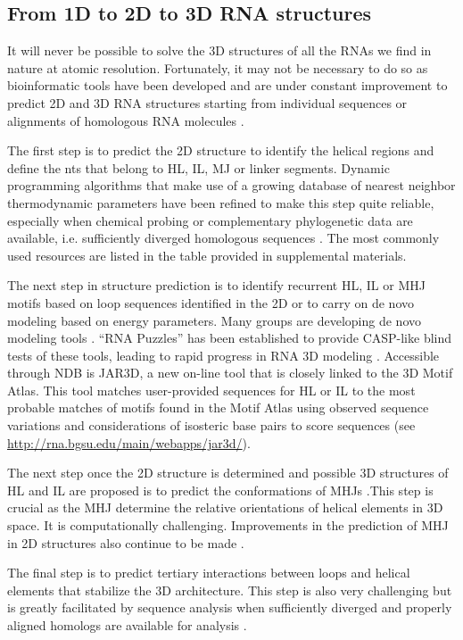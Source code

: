 \subsection{From 1D to 2D to 3D RNA structures}

It will never be possible to solve the 3D structures of all the RNAs we find in
nature at atomic resolution. Fortunately, it may not be necessary to do so as
bioinformatic tools have been developed and are under constant improvement to
predict 2D and 3D RNA structures starting from individual sequences or
alignments of homologous RNA molecules \cite{Leontis2012e}. 

The first step is to predict the 2D structure to identify the helical regions
and define the nts that belong to HL, IL, MJ or linker segments. Dynamic
programming algorithms that make use of a growing database of nearest neighbor
thermodynamic parameters have been refined to make this step quite reliable,
especially when chemical probing or complementary phylogenetic data are
available, i.e. sufficiently diverged homologous sequences \cite{Aigner2012}.
The most commonly used resources are listed in the table provided in
supplemental materials. 

The next step in structure prediction is to identify recurrent HL, IL or MHJ
motifs based on loop sequences identified in the 2D or to carry on de novo
modeling based on energy parameters. Many groups are developing de novo modeling
tools \cite{Rother2012a, Sijenyi2012, Flores2012, Ding2012a, Cao2012}. ``RNA
Puzzles'' has been established to provide CASP-like blind tests of these tools,
leading to rapid progress in RNA 3D modeling \cite{Cruz2012}. Accessible through
NDB is JAR3D, a new on-line tool that is closely linked to the 3D Motif Atlas.
This tool matches user-provided sequences for HL or IL to the most probable
matches of motifs found in the Motif Atlas using observed sequence variations
and considerations of isosteric base pairs to score sequences (see
\url{http://rna.bgsu.edu/main/webapps/jar3d/}).

The next step once the 2D structure is determined and possible 3D structures of
HL and IL are proposed is to predict the conformations of MHJs
\cite{Lamiable2012, Laing2011}.This step is crucial as the MHJ determine the
relative orientations of helical elements in 3D space. It is computationally
challenging. Improvements in the prediction of MHJ in 2D structures also
continue to be made \cite{Liu2011b}.

The final step is to predict tertiary interactions between loops and helical
elements that stabilize the 3D architecture. This step is also very challenging
but is greatly facilitated by sequence analysis when sufficiently diverged and
properly aligned homologs are available for analysis \cite{Michel2000,
Westhof2011}.

